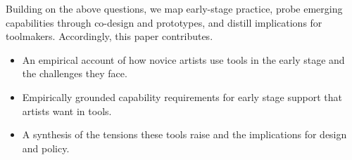 Building on the above questions, we map early-stage practice, probe emerging capabilities through co-design and prototypes, and distill implications for toolmakers. Accordingly, this paper contributes.
\begin{itemize}
     \item An empirical account of how novice artists use tools in the early stage and the challenges they face.
    \item Empirically grounded capability requirements for early stage support that artists want in tools.
    \item A synthesis of the tensions these tools raise and the implications for design and policy.
\end{itemize}